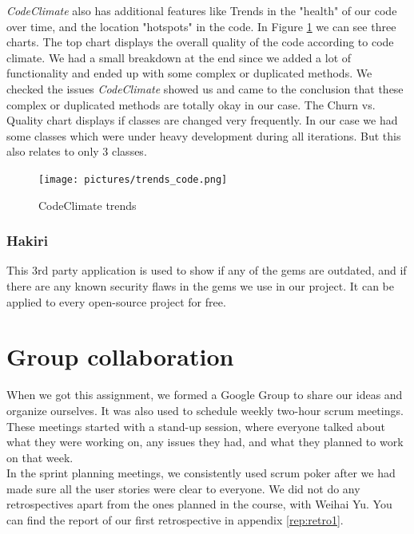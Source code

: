 \documentclass[a4paper]{article}
\begin{document}
\textit{CodeClimate} also has additional features like Trends in the "health" of our code over time, and the location "hotspots" in the code. In Figure \ref{fig:codeclimate} we can see three charts. The top chart displays the overall quality of the code according to code climate. We had a small breakdown at the end since we added a lot of functionality and ended up with some complex or duplicated methods. We checked the issues \textit{CodeClimate} showed us and came to the conclusion that these complex or duplicated methods are totally okay in our case. The Churn vs. Quality chart displays if classes are changed very frequently. In our case we had some classes which were under heavy development during all iterations. But this also relates to only 3 classes.

\begin{figure}[!h]
  \begin{center}
    \texttt{[image: pictures/trends\_code.png]}
    \caption{CodeClimate trends}
    \label{fig:codeclimate}
  \end{center}
\end{figure}

\subsubsection{Hakiri}
This 3rd party application is used to show if any of the gems are outdated, and if there are any known security flaws in the gems we use in our project. It can be applied to every open-source project for free.

\section{Group collaboration}
When we got this assignment, we formed a Google Group to share our ideas and organize ourselves. It was also used to schedule weekly two-hour scrum meetings. These meetings started with a stand-up session, where everyone talked about what they were working on, any issues they had, and what they planned to work on that week.\\

\noindent
In the sprint planning meetings, we consistently used scrum poker after we had made sure all the user stories were clear to everyone. We did not do any retrospectives apart from the ones planned in the course, with Weihai Yu. You can find the report of our first retrospective in appendix \ref{rep:retro1}.\\
\end{document}
